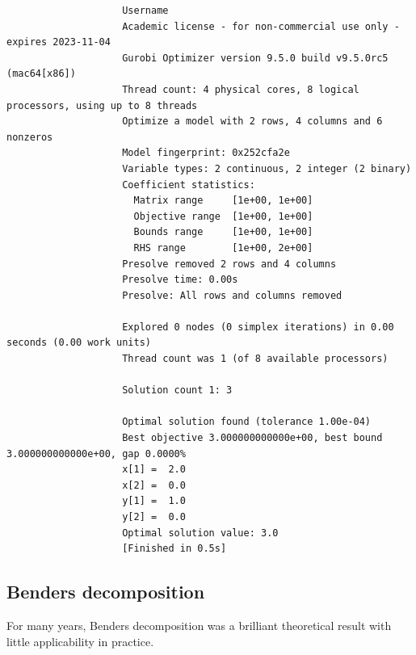 {\tiny

\begin{verbatim}
                    Username
                    Academic license - for non-commercial use only - expires 2023-11-04
                    Gurobi Optimizer version 9.5.0 build v9.5.0rc5 (mac64[x86])
                    Thread count: 4 physical cores, 8 logical processors, using up to 8 threads
                    Optimize a model with 2 rows, 4 columns and 6 nonzeros
                    Model fingerprint: 0x252cfa2e
                    Variable types: 2 continuous, 2 integer (2 binary)
                    Coefficient statistics:
                      Matrix range     [1e+00, 1e+00]
                      Objective range  [1e+00, 1e+00]
                      Bounds range     [1e+00, 1e+00]
                      RHS range        [1e+00, 2e+00]
                    Presolve removed 2 rows and 4 columns
                    Presolve time: 0.00s
                    Presolve: All rows and columns removed
                    
                    Explored 0 nodes (0 simplex iterations) in 0.00 seconds (0.00 work units)
                    Thread count was 1 (of 8 available processors)
                    
                    Solution count 1: 3 
                    
                    Optimal solution found (tolerance 1.00e-04)
                    Best objective 3.000000000000e+00, best bound 3.000000000000e+00, gap 0.0000%
                    x[1] =  2.0
                    x[2] =  0.0
                    y[1] =  1.0
                    y[2] =  0.0
                    Optimal solution value: 3.0
                    [Finished in 0.5s]
\end{verbatim}
}


\newpage

\subsection*{Benders decomposition}



For many years, Benders decomposition \cite{benders62partitioning}  was a brilliant theoretical result with little applicability in practice. 


